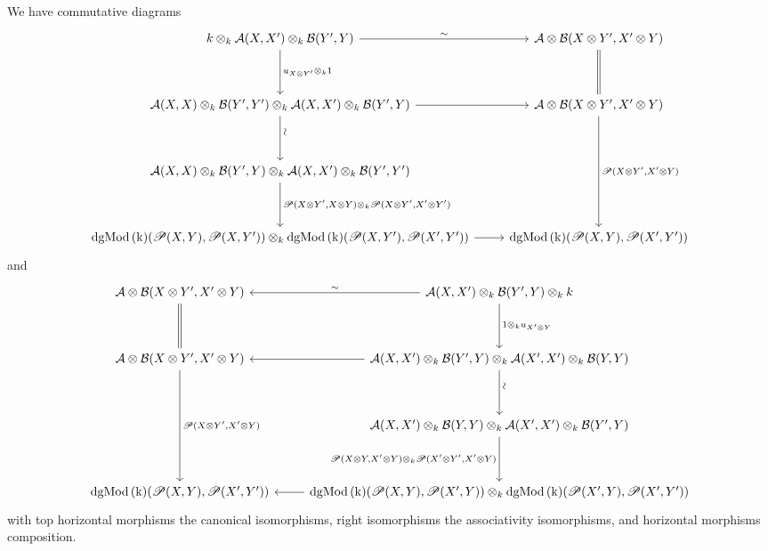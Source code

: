 \documentclass[dissertation.tex]{subfiles}
\begin{document}
\begin{rmk}
  We have commutative diagrams
  $$
  \begin{tikzcd}
    k \otimes_k \A(X,X^\prime) \otimes_k \B(Y^\prime, Y) \arrow{r}{\sim}\arrow{dd}{u_{X \otimes Y^\prime} \otimes_k 1} & \A \otimes \B(X \otimes Y^\prime,X^\prime \otimes Y) \arrow[equals]{dd}\\
    \\
    \A(X,X) \otimes_k \B(Y^\prime, Y^\prime) \otimes_k \A(X,X^\prime) \otimes_k \B(Y^\prime, Y)\arrow{r} \arrow{dd}[rotate=90,yshift=-1ex]{\sim} & \A \otimes \B(X \otimes Y^\prime,X^\prime \otimes Y) \arrow{dddd}{\funct{P}(X \otimes Y^\prime, X^\prime \otimes Y)}\\
    \\
    \A(X,X) \otimes_k \B(Y^\prime, Y) \otimes_k \A(X,X^\prime) \otimes_k \B(Y^\prime, Y^\prime)\arrow{dd}{\funct{P}(X \otimes Y^\prime, X \otimes Y) \otimes_k \funct{P}(X \otimes Y^\prime, X^\prime \otimes Y^\prime)} \\
    \\
    \cdg{k}(\funct{P}(X,Y), \funct{P}(X,Y^\prime)) \otimes_k \cdg{k}(\funct{P}(X,Y^\prime),\funct{P}(X^\prime, Y^\prime))\arrow{r} & \cdg{k}(\funct{P}(X,Y), \funct{P}(X^\prime, Y^\prime)) 
  \end{tikzcd}
  $$
  and
  $$
  \begin{tikzcd}
    \A \otimes \B(X \otimes Y^\prime,X^\prime \otimes Y) \arrow[equals]{dd} & \A(X,X^\prime) \otimes_k \B(Y^\prime, Y)  \otimes_k k\arrow[swap]{l}{\sim}\arrow{dd}{1 \otimes_k u_{X^\prime \otimes Y}}\\
    \\
    \A \otimes \B(X \otimes Y^\prime,X^\prime \otimes Y) \arrow{dddd}{\funct{P}(X \otimes Y^\prime, X^\prime \otimes Y)}  & \A(X,X^\prime) \otimes_k \B(Y^\prime, Y) \otimes_k \A(X^\prime, X^\prime) \otimes_k \B(Y,Y)\arrow{l}\arrow{dd}[rotate=90,yshift=-1ex]{\sim}\\
    \\
    & \A(X,X^\prime) \otimes_k \B(Y,Y) \otimes_k \A(X^\prime, X^\prime) \otimes_k \B(Y^\prime, Y)\arrow[swap]{dd}{\funct{P}(X \otimes Y, X^\prime \otimes Y) \otimes_k \funct{P}(X^\prime \otimes Y^\prime, X^\prime \otimes Y)}\\
    \\
    \cdg{k}(\funct{P}(X,Y), \funct{P}(X^\prime, Y^\prime)) & \cdg{k}(\funct{P}(X,Y), \funct{P}(X^\prime, Y)) \otimes_k \cdg{k}(\funct{P}(X^\prime,Y), \funct{P}(X^\prime, Y^\prime))\arrow{l}
  \end{tikzcd}
  $$
  with top horizontal morphisms the canonical isomorphisms, right isomorphisms the associativity isomorphisms, and horizontal morphisms composition.

\end{rmk}
\end{document}

